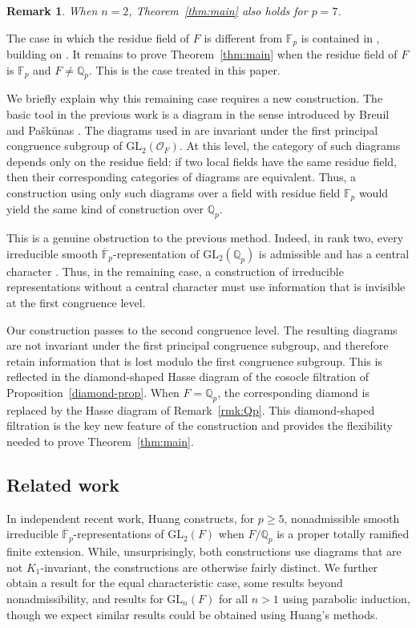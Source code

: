 \documentclass[a4paper,10pt,twoside]{amsart}
\newtheorem{remark}[theorem]{Remark}
\theoremstyle{definition}
\numberwithin{equation}{section}
\begin{document}
\begin{remark}
    When $n=2$, Theorem~\ref{thm:main} also holds for $p=7$.
\end{remark}

The case in which the residue field of \(F\) is different from
\(\mathbb F_p\) is contained in \cite{Le24}, building on
\cite{Le19,GS20, GLS23}. It remains to prove Theorem~\ref{thm:main} when the
residue field of \(F\) is \(\mathbb F_p\) and \(F\neq\mathbb Q_p\). This is
the case treated in this paper.

We briefly explain why this remaining case requires a new construction. The
basic tool in the previous work is a diagram in the sense introduced by
Breuil and Pa\v{s}k\={u}nas \cite{BP12}. The diagrams used in
\cite{Le19,GLS23,Le24} are invariant under the first principal congruence
subgroup of \(\mathrm{GL}_2(\mathcal O_F)\). At this level, the category of
such diagrams depends only on the residue field: if two local fields have the
same residue field, then their corresponding categories of diagrams are
equivalent. Thus, a construction using only such diagrams over a field with
residue field \(\mathbb F_p\) would yield the same kind of construction over
\(\mathbb Q_p\).

This is a genuine obstruction to the previous method. Indeed, in rank two,
every irreducible smooth \(\overline{\mathbb F}_p\)-representation of
\(\mathrm{GL}_2(\mathbb Q_p)\) is admissible and has a central character
\cite{BL94,Bre03,Ber12}. Thus, in the remaining case, a construction of
irreducible representations without a central character must use information
that is invisible at the first congruence level.

Our construction passes to the second congruence level. The resulting
diagrams are not invariant under the first principal congruence subgroup, and
therefore retain information that is lost modulo the first congruence
subgroup. This is reflected in the diamond-shaped Hasse diagram of the cosocle filtration of
Proposition~\ref{diamond-prop}. When \(F=\mathbb Q_p\), the corresponding
diamond is replaced by the Hasse diagram of
Remark~\ref{rmk:Qp}. This diamond-shaped filtration is the key new feature of
the construction and provides the flexibility needed to prove
Theorem~\ref{thm:main}.

\subsection{Related work}

In independent recent work, Huang \cite{Huang} constructs, for \(p\geq 5\), nonadmissible smooth irreducible \(\overline{\mathbb F}_p\)-representations of \(\mathrm{GL}_2(F)\) when \(F/\mathbb Q_p\) is a proper totally ramified finite extension. While, unsurprisingly, both constructions use diagrams that are not \(K_1\)-invariant, the constructions are otherwise fairly distinct. 
We further obtain a result for the equal characteristic case, some results beyond nonadmissibility, and results for \(\mathrm{GL}_n(F)\) for all \(n>1\) using parabolic induction, though we expect similar results could be obtained using Huang's methods. 
\end{document}
